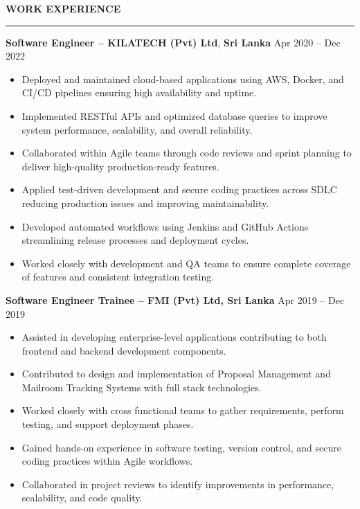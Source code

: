 \documentclass[10pt,letterpaper]{article}
\begin{document}
\vspace{8pt}

\textbf{WORK EXPERIENCE}\\[-8pt]
\noindent\rule{\textwidth}{1pt}

\vspace{-2pt}

\textbf{Software Engineer -- KILATECH (Pvt) Ltd}, \textbf{Sri Lanka} \hfill Apr 2020 -- Dec 2022

\vspace{-1pt}

\begin{itemize}
\item Deployed and maintained cloud-based applications using AWS, Docker, and CI/CD pipelines ensuring high availability and uptime.
\item Implemented RESTful APIs and optimized database queries to improve system performance, scalability, and overall reliability.
\item Collaborated within Agile teams through code reviews and sprint planning to deliver high-quality production-ready features.
\item Applied test-driven development and secure coding practices across SDLC reducing production issues and improving maintainability.
\item Developed automated workflows using Jenkins and GitHub Actions streamlining release processes and deployment cycles.
\item Worked closely with development and QA teams to ensure complete coverage of features and consistent integration testing.
\end{itemize}

\textbf{Software Engineer Trainee -- FMI (Pvt) Ltd, Sri Lanka} \hfill Apr 2019 -- Dec 2019

\vspace{-1pt}

\begin{itemize}
\item Assisted in developing enterprise-level applications contributing to both frontend and backend development components.
\item Contributed to design and implementation of Proposal Management and Mailroom Tracking Systems with full stack technologies.
\item Worked closely with cross functional teams to gather requirements, perform testing, and support deployment phases.
\item Gained hands-on experience in software testing, version control, and secure coding practices within Agile workflows.
\item Collaborated in project reviews to identify improvements in performance, scalability, and code quality.
\end{itemize}
\end{document}
